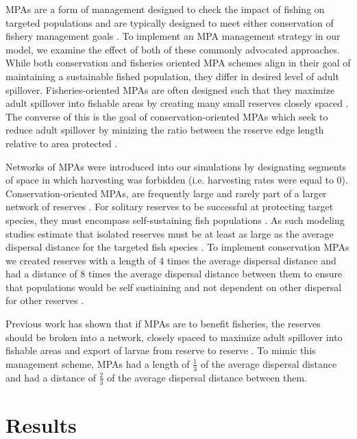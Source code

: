 \documentclass[12pt,english]{article}
\begin{document}
\begin{spacing}{1.9}
\begin{flushleft}
MPAs are a form of management designed to check the impact of fishing on targeted populations and are typically designed to meet either conservation of fishery management goals \citep{Agardy1994, HollandBrazee1996, Gainesetal2010a}. To implement an MPA management strategy in our model, we examine the effect of both of these commonly advocated approaches. While both conservation and fisheries oriented MPA schemes align in their goal of maintaining a sustainable fished population, they differ in desired level of adult spillover. Fisheries-oriented MPAs are often designed such that they maximize adult spillover into fishable areas by creating many small reserves closely spaced \citep{HastingsBotsford2003}. The converse of this is the goal of conservation-oriented MPAs which seek to reduce adult spillover by minizing the ratio between the reserve edge length relative to area protected \citep{Gainesetal2010a}. 

Networks of MPAs were introduced into our simulations by designating segments of space in which harvesting was forbidden (i.e. harvesting rates were equal to $0$). Conservation-oriented MPAs, are frequently large and rarely part of a larger network of reserves \citep{HastingsBotsford2003}. For solitary reserves to be successful at protecting target species, they must encompass self-sustaining fish populations \citep{HastingsBotsford2006, Gainesetal2010a}. As such modeling studies estimate that isolated reserves must be at least as large as the average dispersal distance for the targeted fish species \citep{Lockwoodetal2002, HastingsBotsford2003, Botsfordetal2001, Gainesetal2010}. To implement conservation MPAs we created reserves with a length of 4 times the average dispersal distance and had a distance of 8 times the average dispersal distance between them to ensure that populations would be self sustiaining and not dependent on other dispersal for other reserves \citep{Lockwoodetal2002}. 

Previous work has shown that if MPAs are to benefit fisheries, the reserves should be broken into a network, closely spaced to maximize adult spillover into fishable areas and export of larvae from reserve to reserve \citep{ HastingsBotsford2003, Gaylordetal2005, Gainesetal2010a}. To mimic this management scheme, MPAs had a length of $\tfrac{1}{3}$ of the average dispersal distance and had a distance of $\tfrac{2}{3}$ of the average dispersal distance between them. 

\section{Results}


\end{flushleft}
\end{spacing}
\end{document}
